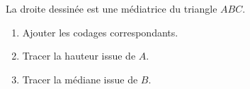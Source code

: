 
\begin{exercice}\label{exosmath-0994}

    La droite dessinée est une médiatrice du triangle \( ABC\). 
    \begin{enumerate}
        \item
            Ajouter les codages correspondants.
        \item
            Tracer la hauteur issue de \( A\).
        \item
            Tracer la médiane issue de \( B\).
    \end{enumerate}

\begin{center}
   
\end{center}

\end{exercice}
